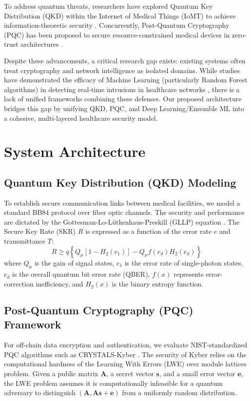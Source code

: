 \documentclass[conference]{IEEEtran}
\begin{document}
To address quantum threats, researchers have explored Quantum Key Distribution (QKD) within the Internet of Medical Things (IoMT) to achieve information-theoretic security \cite{qkd_health_survey_2023}. Concurrently, Post-Quantum Cryptography (PQC) has been proposed to secure resource-constrained medical devices in zero-trust architectures \cite{pqc_iot_health_2024}. 

Despite these advancements, a critical research gap exists: existing systems often treat cryptography and network intelligence as isolated domains. While studies have demonstrated the efficacy of Machine Learning (particularly Random Forest algorithms) in detecting real-time intrusions in healthcare networks \cite{ai_ids_healthcare_2023}, there is a lack of unified frameworks combining these defenses. Our proposed architecture bridges this gap by unifying QKD, PQC, and Deep Learning/Ensemble ML into a cohesive, multi-layered healthcare security model.

\section{System Architecture}
\subsection{Quantum Key Distribution (QKD) Modeling}
To establish secure communication links between medical facilities, we model a standard BB84 protocol over fiber optic channels. The security and performance are dictated by the Gottesman-Lo-L\"{u}tkenhaus-Preskill (GLLP) equation \cite{gllp2004}. The Secure Key Rate (SKR) $R$ is expressed as a function of the error rate $e$ and transmittance $T$:
\begin{equation}
R \ge q \left\{ Q_\mu [1 - H_2(e_1)] - Q_\mu f(e_d) H_2(e_d) \right\}
\end{equation}
where $Q_\mu$ is the gain of signal states, $e_1$ is the error rate of single-photon states, $e_d$ is the overall quantum bit error rate (QBER), $f(x)$ represents error-correction inefficiency, and $H_2(x)$ is the binary entropy function.

\subsection{Post-Quantum Cryptography (PQC) Framework}
For off-chain data encryption and authentication, we evaluate NIST-standardized PQC algorithms such as CRYSTALS-Kyber \cite{crystals2018}. The security of Kyber relies on the computational hardness of the Learning With Errors (LWE) over module lattices problem. Given a public matrix $\mathbf{A}$, a secret vector $\mathbf{s}$, and a small error vector $\mathbf{e}$, the LWE problem assumes it is computationally infeasible for a quantum adversary to distinguish $(\mathbf{A}, \mathbf{A}\mathbf{s} + \mathbf{e})$ from a uniformly random distribution.
\end{document}
